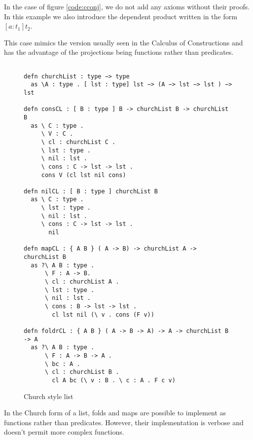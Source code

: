 In the case of figure \ref{code:cconj}, we do not add any axioms without their proofs.   
In this example we also introduce the dependent product written in the form $[ a : t_1 ] t_2$.

This case mimics the version usually seen in the Calculus of Constructions and has the advantage of
the projections being functions rather than predicates.


\begin{figure}[H]
\begin{lstlisting}

defn churchList : type −> type
  as \A : type . [ lst : type] lst −> (A −> lst −> lst ) −> lst

defn consCL : [ B : type ] B -> churchList B -> churchList B
  as \ C : type .
     \ V : C .
     \ cl : churchList C .
     \ lst : type .
     \ nil : lst .
     \ cons : C -> lst -> lst .
     cons V (cl lst nil cons)

defn nilCL : [ B : type ] churchList B
  as \ C : type .
     \ lst : type .
     \ nil : lst .
     \ cons : C -> lst -> lst .
       nil

defn mapCL : { A B } ( A -> B) -> churchList A -> churchList B
  as ?\ A B : type .
      \ F : A -> B.
      \ cl : churchList A .
      \ lst : type .
      \ nil : lst .
      \ cons : B -> lst -> lst .
        cl lst nil (\ v . cons (F v))

defn foldrCL : { A B } ( A -> B -> A) -> A -> churchList B -> A 
  as ?\ A B : type . 
      \ F : A -> B -> A .
      \ bc : A .
      \ cl : churchList B .
        cl A bc (\ v : B . \ c : A . F c v)

\end{lstlisting}
\caption{Church style list}
\label{code:clist}
\end{figure}

In the Church form of a list, folds and maps are possible to implement as functions
rather than predicates. However, their implementation is verbose and doesn’t permit
more complex functions.


